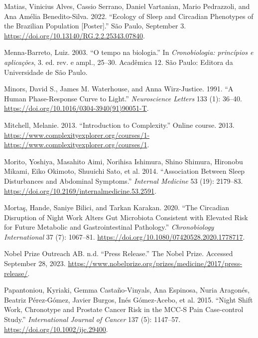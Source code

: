 \documentclass[
  12pt,
  a4paper,
  oneside]{tesesusp}
\newlength{\cslhangindent}
\newlength{\cslentryspacingunit} %
\newenvironment{CSLReferences}[2] %
 {%
  \setlength{\parindent}{0pt}
  \ifodd #1
  \let\oldpar\par
  \def\par{\hangindent=\cslhangindent\oldpar}
  \fi
  \setlength{\parskip}{#2\cslentryspacingunit}
 }%
 {}
\begin{document}
\begin{CSLReferences}{1}{0}
\leavevmode{}%
Matias, Vinicius Alves, Cassio Serrano, Daniel Vartanian, Mario
Pedrazzoli, and Ana Amélia Benedito-Silva. 2022. {``Ecology of Sleep and
Circadian Phenotypes of the Brazilian Population {[}Poster{]}.''} São
Paulo, September 3. \url{https://doi.org/10.13140/RG.2.2.25343.07840}.

\leavevmode{}%
Menna-Barreto, Luiz. 2003. {``O tempo na biologia.''} In
\emph{Cronobiologia: princípios e aplicações}, 3. ed. rev. e ampl.,
25--30. Acadêmica 12. São Paulo: Editora da Universidade de São Paulo.

\leavevmode{}%
Minors, David S., James M. Waterhouse, and Anna Wirz-Justice. 1991. {``A
Human Phase-Response Curve to Light.''} \emph{Neuroscience Letters} 133
(1): 36--40. \url{https://doi.org/10.1016/0304-3940(91)90051-T}.

\leavevmode{}%
Mitchell, Melanie. 2013. {``Introduction to Complexity.''} Online
course. 2013.
\url{https://www.complexityexplorer.org/courses/1-https://www.complexityexplorer.org/courses/1}.

\leavevmode{}%
Morito, Yoshiya, Masahito Aimi, Norihisa Ishimura, Shino Shimura,
Hironobu Mikami, Eiko Okimoto, Shuuichi Sato, et al. 2014.
{``Association Between Sleep Disturbances and Abdominal Symptoms.''}
\emph{Internal Medicine} 53 (19): 2179--83.
\url{https://doi.org/10.2169/internalmedicine.53.2591}.

\leavevmode{}%
Mortaş, Hande, Saniye Bilici, and Tarkan Karakan. 2020. {``The Circadian
Disruption of Night Work Alters Gut Microbiota Consistent with Elevated
Risk for Future Metabolic and Gastrointestinal Pathology.''}
\emph{Chronobiology International} 37 (7): 1067--81.
\url{https://doi.org/10.1080/07420528.2020.1778717}.

\leavevmode{}%
Nobel Prize Outreach AB. n.d. {``Press Release.''} The Nobel Prize.
Accessed September 28, 2023.
\url{https://www.nobelprize.org/prizes/medicine/2017/press-release/}.

\leavevmode{}%
Papantoniou, Kyriaki, Gemma Castaño‐Vinyals, Ana Espinosa, Nuria
Aragonés, Beatriz Pérez‐Gómez, Javier Burgos, Inés Gómez‐Acebo, et al.
2015. {``Night Shift Work, Chronotype and Prostate Cancer Risk in the
MCC‐S Pain Case‐control Study.''} \emph{International Journal of Cancer}
137 (5): 1147--57. \url{https://doi.org/10.1002/ijc.29400}.


\end{CSLReferences}
\end{document}
